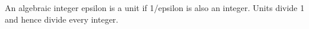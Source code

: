 An algebraic integer epsilon is a unit if 1/epsilon is also an integer. Units divide 1 and hence divide every integer.
